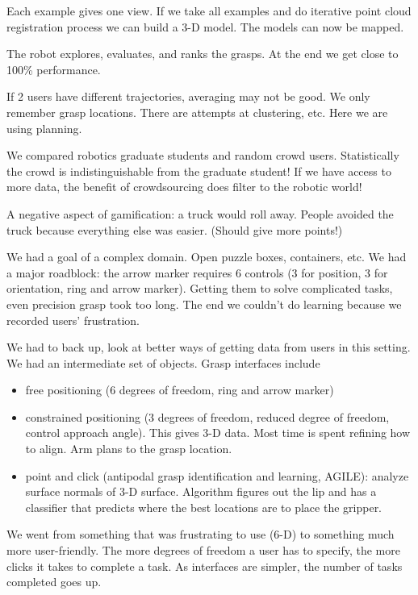 Each example gives one view. If we take all examples and do iterative point cloud registration process we can build a 3-D model.
The models can now be mapped. 

The robot explores, evaluates, and ranks the grasps. At the end we get close to 100\% performance. 

If 2 users have different trajectories, averaging may not be good. %
We only remember grasp locations. There are attempts at clustering, etc. Here we are using planning.

We compared robotics graduate students and random crowd users. Statistically the crowd is indistinguishable from the graduate student!
If we have access to more data, the benefit of crowdsourcing does filter to the robotic world!

A negative aspect of gamification: a truck would roll away. People avoided the truck because everything else was easier. (Should give more points!)

We had a goal of a complex domain. Open puzzle boxes, containers, etc. We had a major roadblock: the arrow marker requires 6 controls (3 for position, 3 for orientation, ring and arrow marker). Getting them to solve complicated tasks, even precision grasp took too long. The end we couldn't do learning because we recorded users' frustration.

We had to back up, look at better ways of getting data from users in this setting. %
We had an intermediate set of objects. 
Grasp interfaces include
\begin{itemize}
\item
free positioning (6 degrees of freedom, ring and arrow marker)
\item
constrained positioning (3 degrees of freedom, reduced degree of freedom, control approach angle). This gives 3-D data. Most time is spent refining how to align. Arm plans to the grasp location.
\item
point and click (antipodal grasp identification and learning, AGILE): analyze surface normals of 3-D surface. Algorithm figures out the lip and has a classifier that predicts where the best locations are to place the gripper. 
\end{itemize}

We went from something that was frustrating to use (6-D) to something much more user-friendly. The more degrees of freedom a user has to specify, the more clicks it takes to complete a task. As interfaces are simpler, the number of tasks completed goes up.

